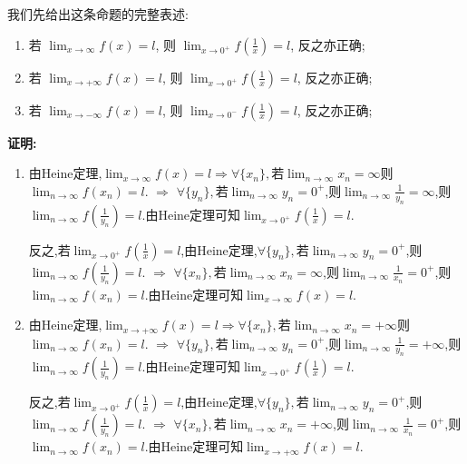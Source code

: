 \begin{solution}
    我们先给出这条命题的完整表述:
    \begin{proposition*}
        \begin{enumerate}[(1)]
            \item 若 $\lim_{x \to \infty} f(x) = l$, 则 $\lim_{x \to 0^+} f\left(\frac{1}{x}\right)=l$, 反之亦正确;
            \item 若 $\lim_{x \to +\infty} f(x) = l$, 则 $\lim_{x \to 0^+} f\left(\frac{1}{x}\right)=l$, 反之亦正确;
            \item 若 $\lim_{x \to -\infty} f(x) = l$, 则 $\lim_{x \to 0^-} f\left(\frac{1}{x}\right)=l$, 反之亦正确;
        \end{enumerate}
    \end{proposition*}
    \noindent
    \textbf{证明:}
    \begin{enumerate}[(1)]
        \item 由Heine定理,$\lim_{x \to \infty} f(x) = l \Rightarrow \forall \{x_n\},$若$\lim_{n \to \infty} x_n = \infty$则$\lim_{n \to \infty} f(x_n) = l$. $\Rightarrow$ $\forall \{ y_n \},$若$\lim_{n \to \infty} y_n = 0^+$,则$\lim_{n \to \infty} \frac{1}{y_n} = \infty$,则$\lim_{n \to \infty} f\left( \frac{1}{y_n} \right) = l$.由Heine定理可知$\lim_{x \to 0^+} f\left(\frac{1}{x}\right)=l$.

              反之,若$\lim_{x \to 0^+} f\left(\frac{1}{x}\right)=l$,由Heine定理,$\forall \{y_n\},$若$\lim_{n \to \infty} y_n = 0^+$,则$\lim_{n \to \infty} f\left( \frac{1}{y_n} \right) = l$. $\Rightarrow$ $\forall \{x_n\},$若$\lim_{n \to \infty} x_n = \infty$,则$\lim_{n \to \infty} \frac{1}{x_n} = 0^+$,则$\lim_{n \to \infty} f(x_n) = l$.由Heine定理可知$\lim_{x \to \infty} f(x) = l$.
        \item 由Heine定理,$\lim_{x \to +\infty} f(x) = l \Rightarrow \forall \{x_n\},$若$\lim_{n \to \infty} x_n = +\infty$则$\lim_{n \to \infty} f(x_n) = l$. $\Rightarrow$ $\forall \{ y_n \},$若$\lim_{n \to \infty} y_n = 0^+$,则$\lim_{n \to \infty} \frac{1}{y_n} = +\infty$,则$\lim_{n \to \infty} f\left( \frac{1}{y_n} \right) = l$.由Heine定理可知$\lim_{x \to 0^+} f\left(\frac{1}{x}\right)=l$.

              反之,若$\lim_{x \to 0^+} f\left(\frac{1}{x}\right)=l$,由Heine定理,$\forall \{y_n\},$若$\lim_{n \to \infty} y_n = 0^+$,则$\lim_{n \to \infty} f\left( \frac{1}{y_n} \right) = l$. $\Rightarrow$ $\forall \{x_n\},$若$\lim_{n \to \infty} x_n = +\infty$,则$\lim_{n \to \infty} \frac{1}{x_n} = 0^+$,则$\lim_{n \to \infty} f(x_n) = l$.由Heine定理可知$\lim_{x \to +\infty} f(x) = l$.


\end{enumerate}
\end{solution}

